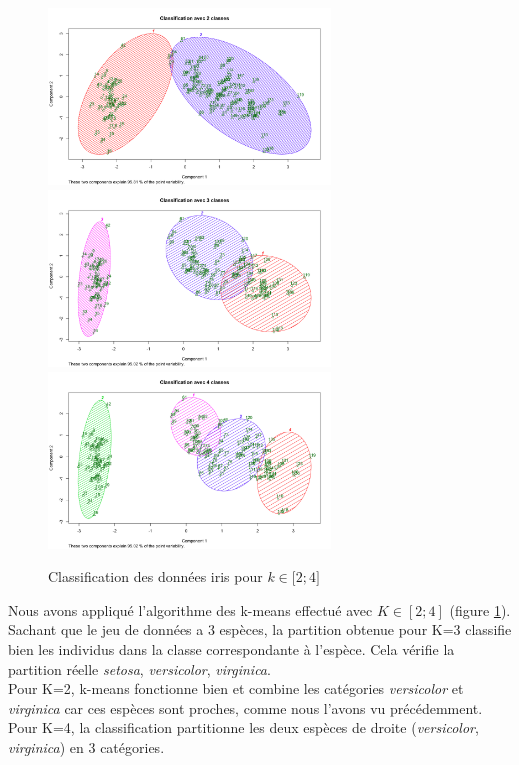 \documentclass{article}
\begin{document}
\begin{figure}[H]
\centering
\includegraphics[width=7.5cm]{./img/iris_kmeans_2.png}
\includegraphics[width=7.5cm]{./img/iris_kmeans_3.png}
\includegraphics[width=7.5cm]{./img/iris_kmeans_4.png}
\caption{Classification des données iris pour $k \in \lbrack2;4\rbrack$}
\label{iris_kmeans_2_3_4}
\end{figure}

Nous avons appliqué l'algorithme des k-means effectué avec $K \in [2;4]$ (figure \ref{iris_kmeans_2_3_4}).\\
Sachant que le jeu de données a 3 espèces, la partition obtenue pour K=3 classifie bien les individus dans la classe correspondante à l'espèce. Cela vérifie la partition réelle \textit{setosa}, \textit{versicolor}, \textit{virginica}.\\
Pour K=2, k-means fonctionne bien et combine les catégories \textit{versicolor} et \textit{virginica} car ces espèces sont proches, comme nous l'avons vu précédemment.\\
Pour K=4, la classification partitionne les deux espèces de droite (\textit{versicolor}, \textit{virginica}) en 3 catégories.
\end{document}
